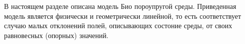 %
% 


В настоящем разделе описана модель Био пороупругой среды.
Приведенная модель является физически и геометрически линейной, то
есть
соответствует случаю малых отклонений полей, описывающих состоние
среды, от своих равновесных (опорных) значений.









